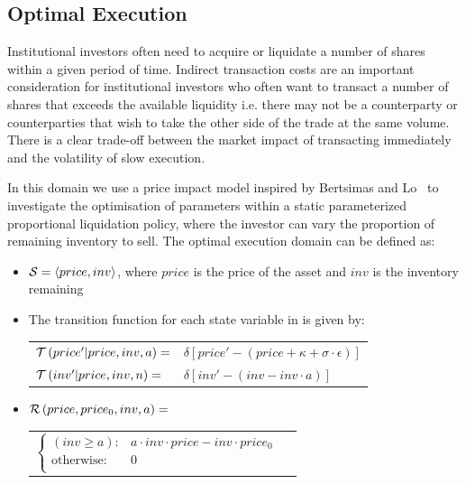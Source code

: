 \subsection{Optimal Execution}
\label{sec:results_oe}

Institutional investors often need to acquire or liquidate a number of shares within a given period of time. Indirect transaction costs are an important consideration for institutional investors who often want to transact a number of shares that exceeds the available liquidity i.e. there may not be a counterparty or counterparties that wish to take the other side of the trade at the same volume. There is a clear trade-off between the market impact of transacting immediately and the volatility of slow execution. 

In this domain we use a price impact model inspired by Bertsimas and Lo~\parencite{Bertsimas_JFM_1998} to investigate the optimisation of parameters within a static parameterized proportional liquidation policy, where the investor can vary the proportion of remaining inventory to sell. The optimal execution domain can be defined as:
\begin{itemize}
    \item {\footnotesize $ \mathcal{S} = \left\langle price, inv \right\rangle$}, where $ price $ is the price of the asset and $ inv $ is the inventory remaining
    \item The transition function {\footnotesize \Transition} for each state variable in {\footnotesize \State} is given by:    \\
    {\footnotesize 
        \abovedisplayskip=5pt
        \belowdisplayskip=0pt
        \renewcommand{\arraystretch}{1.5}
        \begin{tabular}{ll}
            $ \mathcal{T}\left( price' | price, inv, a \right) =$ & $ \delta \left[ price' - (price + \kappa + \sigma \cdot \epsilon) \right] $ \\
            $\mathcal{T}\left( inv' | price, inv, n \right) =$ & $ \delta \left[ inv' - (inv - inv \cdot a) \right] $ \\
        \end{tabular}
    }%
    \item {\footnotesize $ \mathcal{R}\left(price, price_0, inv, a \right) =$} \\
    {\footnotesize 
        \abovedisplayskip=10pt
        \belowdisplayskip=0pt
        \renewcommand{\arraystretch}{1.5}
        \begin{tabular}{ll}    
           $ \begin{cases}
                (inv \geq a) : & a \cdot inv \cdot price - inv \cdot price_0 \\
                \text{otherwise} : & 0 \\
            \end{cases} $ & $ $ \\
        \end{tabular}
    } \\    
\end{itemize}

